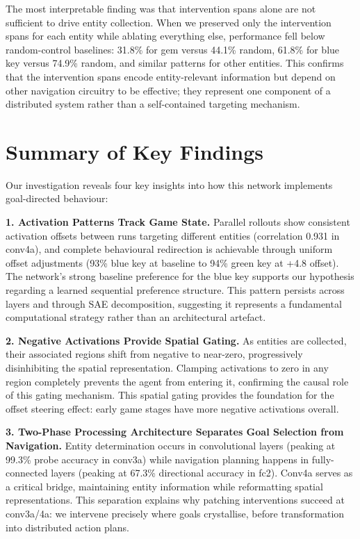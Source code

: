 The most interpretable finding was that intervention spans alone are not sufficient to drive entity collection. When we preserved only the intervention spans for each entity while ablating everything else, performance fell below random-control baselines: 31.8\% for gem versus 44.1\% random, 61.8\% for blue key versus 74.9\% random, and similar patterns for other entities. This confirms that the intervention spans encode entity-relevant information but depend on other navigation circuitry to be effective; they represent one component of a distributed system rather than a self-contained targeting mechanism.






\section{Summary of Key Findings}
\label{sec:results_summary_key_findings}

Our investigation reveals four key insights into how this network implements goal-directed behaviour:

\textbf{1. Activation Patterns Track Game State.} Parallel rollouts show consistent activation offsets between runs targeting different entities (correlation 0.931 in conv4a), and complete behavioural redirection is achievable through uniform offset adjustments (93\% blue key at baseline to 94\% green key at +4.8 offset). The network's strong baseline preference for the blue key supports our hypothesis regarding a learned sequential preference structure. This pattern persists across layers and through SAE decomposition, suggesting it represents a fundamental computational strategy rather than an architectural artefact.

\textbf{2. Negative Activations Provide Spatial Gating.} As entities are collected, their associated regions shift from negative to near-zero, progressively disinhibiting the spatial representation. Clamping activations to zero in any region completely prevents the agent from entering it, confirming the causal role of this gating mechanism. This spatial gating provides the foundation for the offset steering effect: early game stages have more negative activations overall.

\textbf{3. Two-Phase Processing Architecture Separates Goal Selection from Navigation.} Entity determination occurs in convolutional layers (peaking at 99.3\% probe accuracy in conv3a) while navigation planning happens in fully-connected layers (peaking at 67.3\% directional accuracy in fc2). Conv4a serves as a critical bridge, maintaining entity information while reformatting spatial representations. This separation explains why patching interventions succeed at conv3a/4a: we intervene precisely where goals crystallise, before transformation into distributed action plans.

